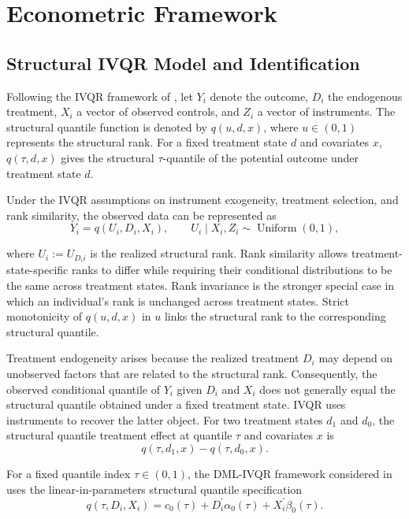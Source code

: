 \section{Econometric Framework}

\subsection{Structural IVQR Model and Identification}

Following the IVQR framework of \textcite{chernozhukov_hansen_2005}, let \(Y_i\) denote the outcome, \(D_i\) the endogenous treatment, \(X_i\) a vector of observed controls, and \(Z_i\) a vector of instruments. The structural quantile function is denoted by \(q(u,d,x)\), where \(u\in(0,1)\) represents the structural rank. For a fixed treatment state \(d\) and covariates \(x\), \(q(\tau,d,x)\) gives the structural \(\tau\)-quantile of the potential outcome under treatment state \(d\).

Under the IVQR assumptions on instrument exogeneity, treatment selection, and rank similarity, the observed data can be represented as
\begin{equation}
    Y_i = q(U_i,D_i,X_i),
    \qquad
    U_i \mid X_i,Z_i \sim \operatorname{Uniform}(0,1),
    \label{eq:structural-ivqr}
\end{equation}

where \(U_i:=U_{D_i i}\) is the realized structural rank. Rank similarity allows treatment-state-specific ranks to differ while requiring their conditional distributions to be the same across treatment states. Rank invariance is the stronger special case in which an individual's rank is unchanged across treatment states. Strict monotonicity of \(q(u,d,x)\) in \(u\) links the structural rank to the corresponding structural quantile.

Treatment endogeneity arises because the realized treatment \(D_i\) may depend on unobserved factors that are related to the structural rank. Consequently, the observed conditional quantile of \(Y_i\) given \(D_i\) and \(X_i\) does not generally equal the structural quantile obtained under a fixed treatment state. IVQR uses instruments to recover the latter object. For two treatment states \(d_1\) and \(d_0\), the structural quantile treatment effect at quantile \(\tau\) and covariates \(x\) is
\[
    q(\tau,d_1,x)-q(\tau,d_0,x).
\]

For a fixed quantile index \(\tau\in(0,1)\), the DML-IVQR framework considered in \textcite{chen_huang_tien_2021} uses the linear-in-parameters structural quantile specification
\begin{equation}
    q(\tau,D_i,X_i)
    = c_0(\tau)
      + D_i^{\prime}\alpha_0(\tau)
      + X_i^{\prime}\beta_0(\tau).
    \label{eq:linear-structural-quantile}
\end{equation}

